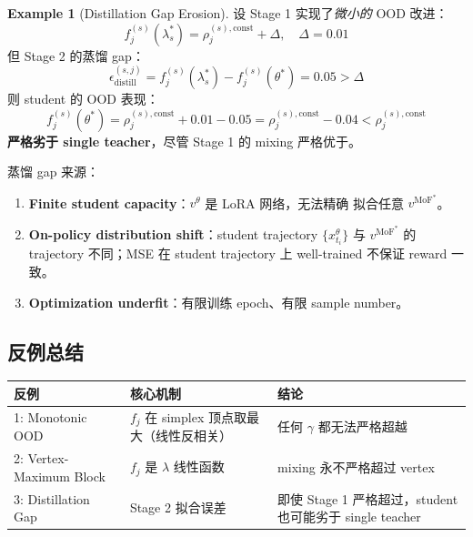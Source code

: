 \documentclass[11pt,a4paper]{article}
\newcommand{\MoF}{\mathrm{MoF}}
\newcommand{\const}{\mathrm{const}}
\theoremstyle{definition}
\newtheorem{example}{Example}
\begin{document}
\begin{example}[Distillation Gap Erosion]
\label{ex:distill_erode}
设 Stage 1 实现了\emph{微小的} OOD 改进：
\begin{equation}
f_j^{(s)}(\lambda_s^*) = \rho_j^{(s),\const} + \Delta, \quad \Delta = 0.01
\end{equation}
但 Stage 2 的蒸馏 gap：
\begin{equation}
\epsilon_{\text{distill}}^{(s,j)} = f_j^{(s)}(\lambda_s^*) - f_j^{(s)}(\theta^*) = 0.05 > \Delta
\end{equation}
则 student 的 OOD 表现：
\begin{equation}
f_j^{(s)}(\theta^*) = \rho_j^{(s),\const} + 0.01 - 0.05 = \rho_j^{(s),\const} - 0.04 < \rho_j^{(s),\const}
\end{equation}
\textbf{严格劣于 single teacher}，尽管 Stage 1 的 mixing 严格优于。

蒸馏 gap 来源：
\begin{enumerate}[leftmargin=1.5em]
\item \textbf{Finite student capacity}：$v^\theta$ 是 LoRA 网络，无法精确
拟合任意 $v^{\MoF^*}$。
\item \textbf{On-policy distribution shift}：student trajectory $\{x_{t_i}^\theta\}$
与 $v^{\MoF^*}$ 的 trajectory 不同；MSE 在 student trajectory 上 well-trained
不保证 reward 一致。
\item \textbf{Optimization underfit}：有限训练 epoch、有限 sample number。
\end{enumerate}
\end{example}

\subsection{反例总结}

\begin{center}
\renewcommand{\arraystretch}{1.4}
\begin{tabular}{@{}p{4.5cm} p{4cm} p{5cm}@{}}
\toprule
\textbf{反例} & \textbf{核心机制} & \textbf{结论} \\
\midrule
1: Monotonic OOD &
$f_j$ 在 simplex 顶点取最大（线性反相关）&
任何 $\gamma$ 都无法严格超越 \\
\midrule
2: Vertex-Maximum Block &
$f_j$ 是 $\lambda$ 线性函数 &
mixing 永不严格超过 vertex \\
\midrule
3: Distillation Gap &
Stage 2 拟合误差 &
即使 Stage 1 严格超过，student 也可能劣于 single teacher \\
\bottomrule
\end{tabular}
\end{center}
\end{document}
